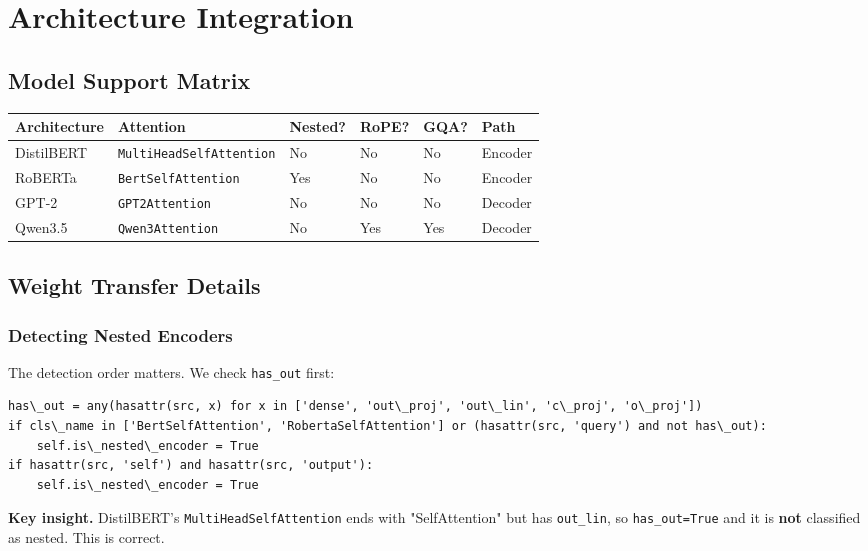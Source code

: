 
\section{Architecture Integration}

\subsection{Model Support Matrix}

\begin{table}[H]
\centering
\small
\begin{tabular}{llllll}
\toprule
\textbf{Architecture} & \textbf{Attention} & \textbf{Nested?} & \textbf{RoPE?} & \textbf{GQA?} & \textbf{Path} \\
\midrule
DistilBERT & \texttt{MultiHeadSelfAttention} & No & No & No & Encoder \\
RoBERTa & \texttt{BertSelfAttention} & Yes & No & No & Encoder \\
GPT-2 & \texttt{GPT2Attention} & No & No & No & Decoder \\
Qwen3.5 & \texttt{Qwen3Attention} & No & Yes & Yes & Decoder \\
\bottomrule
\end{tabular}
\end{table}

\subsection{Weight Transfer Details}

\subsubsection{Detecting Nested Encoders}

The detection order matters. We check \texttt{has\_out} first:

\begin{lstlisting}
has\_out = any(hasattr(src, x) for x in ['dense', 'out\_proj', 'out\_lin', 'c\_proj', 'o\_proj'])
if cls\_name in ['BertSelfAttention', 'RobertaSelfAttention'] or (hasattr(src, 'query') and not has\_out):
    self.is\_nested\_encoder = True
if hasattr(src, 'self') and hasattr(src, 'output'):
    self.is\_nested\_encoder = True
\end{lstlisting}

\textbf{Key insight.} DistilBERT's \texttt{MultiHeadSelfAttention} ends with "SelfAttention" but has \texttt{out\_lin}, so \texttt{has\_out=True} and it is \textbf{not} classified as nested. This is correct.

